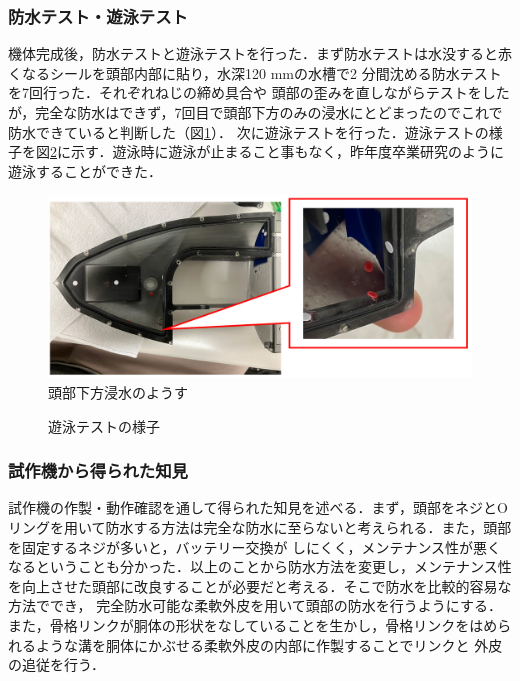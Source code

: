 \subsubsection{防水テスト・遊泳テスト}
機体完成後，防水テストと遊泳テストを行った．まず防水テストは水没すると赤くなるシールを頭部内部に貼り，水深120 mmの水槽で2 分間沈める防水テストを7回行った．それぞれねじの締め具合や
頭部の歪みを直しながらテストをしたが，完全な防水はできず，7回目で頭部下方のみの浸水にとどまったのでこれで防水できていると判断した（図\ref{fig:bousuitest_sisaku}）．
次に遊泳テストを行った．遊泳テストの様子を図\ref{fig:test_sisaku}に示す．遊泳時に遊泳が止まること事もなく，昨年度卒業研究のように遊泳することができた．

\begin{figure}[t]
    \centering
    \includegraphics[width=0.80\linewidth]{chapters/picture/bousuitest.png}
    \caption{頭部下方浸水のようす}
    \label{fig:bousuitest_sisaku}
\end{figure}
\begin{figure}[t]
    \centering
    \caption{遊泳テストの様子}
    \label{fig:test_sisaku}
\end{figure}

\subsubsection{試作機から得られた知見}
試作機の作製・動作確認を通して得られた知見を述べる．まず，頭部をネジとOリングを用いて防水する方法は完全な防水に至らないと考えられる．また，頭部を固定するネジが多いと，バッテリー交換が
しにくく，メンテナンス性が悪くなるということも分かった．以上のことから防水方法を変更し，メンテナンス性を向上させた頭部に改良することが必要だと考える．そこで防水を比較的容易な方法ででき，
完全防水可能な柔軟外皮を用いて頭部の防水を行うようにする．また，骨格リンクが胴体の形状をなしていることを生かし，骨格リンクをはめられるような溝を胴体にかぶせる柔軟外皮の内部に作製することでリンクと
外皮の追従を行う．